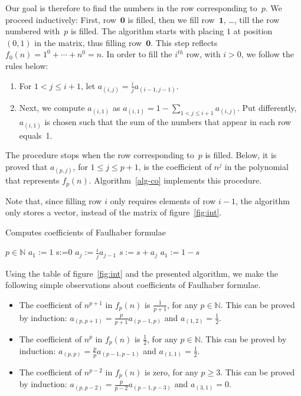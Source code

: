 \documentclass[a4paper,10pt]{amsart}
\theoremstyle{remark}
\newcommand{\nat}{\mathbb{N}}
\begin{document}
Our goal is therefore to find the numbers in the row corresponding
to~$p$. We proceed inductively: First, row~$\mathbf{0}$ is filled,
then we fill row~$\mathbf{1}$, \ldots, till the row numbered
with~$p$ is filled.  The algorithm starts with placing $1$ at
position~$(0,1)$ in the matrix, thus filling row~$\mathbf{0}$. This step
reflects $f_0(n)=1^0+\cdots+n^0=n$.
In order to fill the $i^\mathit{th}$ row, with $i>0$, we follow the
rules below:
\begin{enumerate}
\item
For $1<j\le i+1$, let $a_{(i,j)}=\frac{i}{j} a_{(i-1,j-1)}$.
\item Next, we compute $a_{(i,1)}$ as
$a_{(i,1)}=1-\sum_{1<j\le i+1}a_{(i,j)}$. Put differently, $a_{(i,1)}$
is chosen such that the sum of the numbers that appear in each row
equals~1.
\end{enumerate}
The procedure stops when the row corresponding to~$p$ is
filled. Below, it is proved that $a_{(p,j)}$, for $1\le j\le p+1$, is
the coefficient of $n^j$ in the polynomial that represents $f_p(n)$.
Algorithm~\ref{alg-co} implements this procedure.

Note that, since filling row $i$ only requires elements of row $i-1$,
the algorithm only stores a vector, instead of the matrix of
figure~\ref{fig:int}. 


\begin{algorithm}
\caption{Computes coefficients of Faulhaber formulae}
\begin{algorithmic}
\label{alg-co}
\REQUIRE $p\in\nat$
\STATE $a_{1}:=1$
\STATE s:=0
\STATE $a_j:=\frac{i}{j} a_{j-1}$
\STATE $s:= s + a_j$
\ENDFOR
\STATE $a_1:=1-s$
\ENDFOR
{}
\end{algorithmic}
\end{algorithm}

Using the table of figure~\ref{fig:int} and the presented algorithm, 
we make the following simple observations about coefficients of
Faulhaber formulae.
\begin{itemize}
\item The coefficient of $n^{p+1}$ in $f_p(n)$ is $\frac{1}{p+1}$, for
any $p\in\nat$. This can be proved by induction:
$a_{(p,p+1)}=\frac{p}{p+1}a_{(p-1,p)}$ and $a_{(1,2)}=\frac{1}{2}$.
\item The coefficient of $n^p$ in $f_p(n)$ is $\frac{1}{2}$, for any
$p\in\nat$. This can be proved by induction:
$a_{(p,p)}=\frac{p}{p}a_{(p-1,p-1)}$ and $a_{(1,1)}=\frac{1}{2}$.
\item The coefficient of $n^{p-2}$ in $f_p(n)$ is zero, for any $p\ge
3$. This can be proved by induction:
$a_{(p,p-2)}=\frac{p}{p-2}a_{(p-1,p-3)}$ and $a_{(3,1)}=0$.
\end{itemize}
\end{document}
